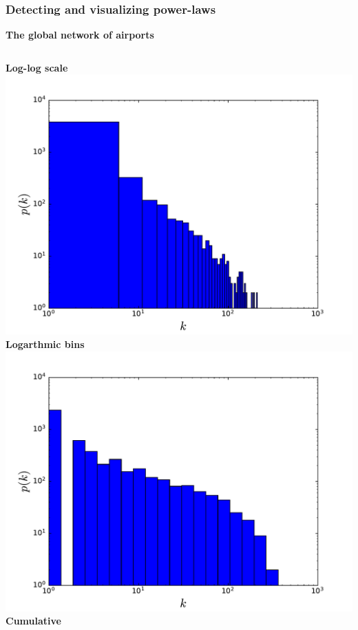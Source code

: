 \documentclass{beamer}
\begin{document}
\begin{frame}
    \frametitle{Detecting and visualizing power-laws}
    \centering
    {\bf The global network of airports}
    
    \vspace{2em}
    \begin{columns}
        \centering
        {\bf Log-log scale}
        \includegraphics[width=\columnwidth]{deg_distri_global_airport_log.pdf}
        \centering
        {\bf Logarthmic bins}
        \includegraphics[width=\columnwidth]{deg_distri_global_airport_log_logbins.pdf}
        \centering
        {\bf Cumulative }

\end{columns}
\end{frame}
\end{document}
